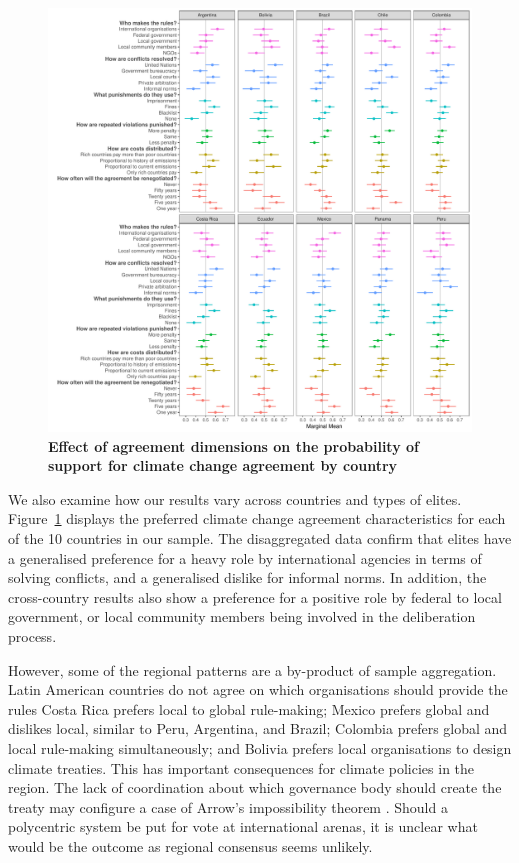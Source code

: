 \documentclass[a4paper,12pt]{article}
\begin{document}
\begin{figure}[H]
	\centering
	\includegraphics[width=\linewidth]{countries.pdf}
	\caption{\textbf{Effect of agreement dimensions on the probability of support for climate change agreement by country}}
	\label{fig:countries}
\end{figure}

We also examine how our results vary across countries and types of elites. Figure~\ref{fig:countries} displays the preferred climate change agreement characteristics for each of the 10 countries in our sample. The disaggregated data confirm that elites have a generalised preference for a heavy role by international agencies in terms of solving conflicts, and a generalised dislike for informal norms. In addition, the cross-country results also show a preference for a positive role by federal to local government, or local community members being involved in the deliberation process.

However, some of the regional patterns are a by-product of sample aggregation. Latin American countries do not agree on which organisations should provide the rules Costa Rica prefers local to global rule-making; Mexico prefers global and dislikes local, similar to Peru, Argentina, and Brazil; Colombia prefers global and local rule-making simultaneously; and Bolivia prefers local organisations to design climate treaties. This has important consequences for climate policies in the region. The lack of coordination about which governance body should create the treaty may configure a case of Arrow's impossibility theorem \citep{arrow1950difficulty}. Should a polycentric system be put for vote at international arenas, it is unclear what would be the outcome as regional consensus seems unlikely. 
\end{document}
